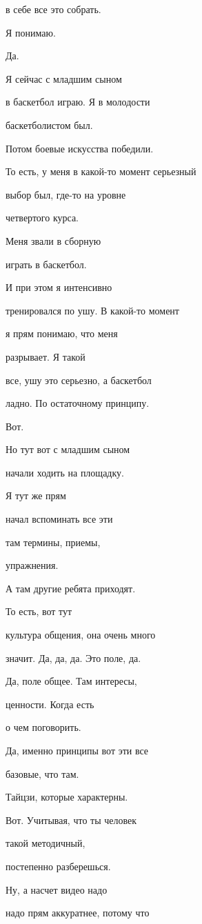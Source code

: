 в себе все это собрать.

Я понимаю.

Да.

Я сейчас с младшим сыном

в баскетбол играю. Я в молодости

баскетболистом был.

Потом боевые искусства победили.

То есть, у меня в какой-то момент серьезный

выбор был, где-то на уровне

четвертого курса.

Меня звали в сборную

играть в баскетбол.

И при этом я интенсивно

тренировался по ушу. В какой-то момент

я прям понимаю, что меня

разрывает. Я такой

все, ушу это серьезно, а баскетбол

ладно. По остаточному принципу.

Вот.

Но тут вот с младшим сыном

начали ходить на площадку.

Я тут же прям

начал вспоминать все эти

там термины, приемы,

упражнения.

А там другие ребята приходят.

То есть, вот тут

культура общения, она очень много

значит. Да, да, да. Это поле, да.

Да, поле общее. Там интересы,

ценности. Когда есть

о чем поговорить.

Да, именно принципы вот эти все

базовые, что там.

Тайцзи, которые характерны.

Вот. Учитывая, что ты человек

такой методичный,

постепенно разберешься.

Ну, а насчет видео надо

надо прям аккуратнее, потому что

